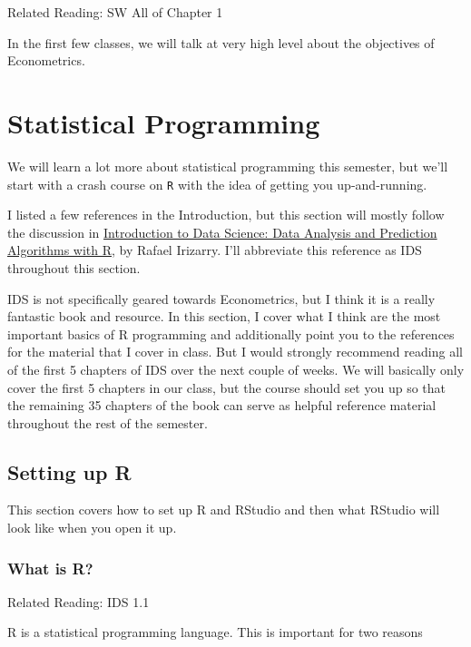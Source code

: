 \documentclass[
  letterpaper,
  DIV=11,
  numbers=noendperiod]{scrreprt}
\begin{document}
Related Reading: SW All of Chapter 1

In the first few classes, we will talk at very high level about the
objectives of Econometrics.


\chapter{Statistical Programming}\label{statistical-programming}

We will learn a lot more about statistical programming this semester,
but we'll start with a crash course on \texttt{R} with the idea of
getting you up-and-running.

I listed a few references in the Introduction, but this section will
mostly follow the discussion in
\href{https://rafalab.github.io/dsbook/}{Introduction to Data Science:
Data Analysis and Prediction Algorithms with R}, by Rafael Irizarry.
I'll abbreviate this reference as IDS throughout this section.

IDS is not specifically geared towards Econometrics, but I think it is a
really fantastic book and resource. In this section, I cover what I
think are the most important basics of R programming and additionally
point you to the references for the material that I cover in class. But
I would strongly recommend reading all of the first 5 chapters of IDS
over the next couple of weeks. We will basically only cover the first 5
chapters in our class, but the course should set you up so that the
remaining 35 chapters of the book can serve as helpful reference
material throughout the rest of the semester.

\section{Setting up R}\label{setting-up-r}

This section covers how to set up R and RStudio and then what RStudio
will look like when you open it up.

\subsection{What is R?}\label{what-is-r}

Related Reading: IDS 1.1

R is a statistical programming language. This is important for two
reasons
\end{document}
